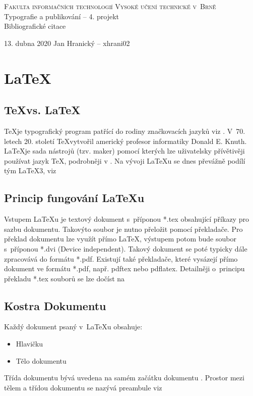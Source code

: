 \documentclass[11pt, a4paper]{article}
\begin{document}
\begin{titlepage}
\begin{center}

\Huge
\textsc{Fakulta informačních technologií Vysoké učení technické v~Brně\\}
\LARGE
Typografie a publikování -- 4. projekt \\
\Huge{Bibliografické citace}
\end{center}
{\large 13. dubna 2020 \hfill Jan Hranický -- xhrani02}
\end{titlepage}
\section{\LaTeX}
\subsection{\TeX  vs. \LaTeX}
\TeX je typografický program patřící do rodiny značkovacích jazyků viz \cite{KopkaHelmut2004AGtL}. V~70. letech 20. století \TeX vytvořil americký profesor informatiky Donald E. Knuth. \LaTeX  je sada nástrojů (tzv. maker) pomocí kterých lze uživatelsky přívětivěji používat jazyk \TeX, podrobněji v \cite{KopkaHelmut2004L}. Na vývoji \LaTeX u se dnes převážně podílí tým \LaTeX 3, viz \cite{wikiLaTeX}
\subsection{Princip fungování \LaTeX u}
Vstupem \LaTeX u je textový dokument s~příponou *.tex obsahující příkazy pro sazbu dokumentu. Takovýto soubor je nutno přeložit pomocí překladače. Pro překlad dokumentu lze využít přímo \LaTeX, výstupem potom bude soubor s~příponou *.dvi (Device independent). Takový dokument se poté typicky dále zpracovává do formátu *.pdf. Existují také překladače, které vysázejí přímo dokument ve formátu *.pdf, např. pdftex nebo pdflatex. Detailněji o~principu překladu *.tex souborů se lze dočíst na \cite{BOJKO2011thesis}
\subsection{Kostra Dokumentu}
Každý dokument psaný v~{\LaTeX}u obsahuje:
\begin{itemize}
  \item Hlavičku
  \item Tělo dokumentu
\end{itemize}
Třída dokumentu bývá uvedena na samém začátku dokumentu \cite{onlineRoot}. Prostor mezi tělem a třídou dokumentu se nazývá preambule viz \cite{KopkaHelmut2004L} \cite{Cerny2011}
\end{document}

